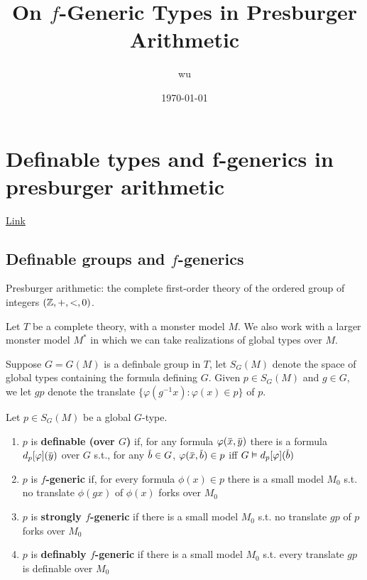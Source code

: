 \documentclass[11pt]{article}
\author{wu}
\date{\today}
\title{On \(f\)-Generic Types in Presburger Arithmetic}
\begin{document}
\maketitle
\tableofcontents

\section{Definable types and f-generics in presburger arithmetic}
\label{sec:orgb16624a}
\href{https://people.math.osu.edu/conant.38/Math/presburger\_note.pdf}{Link}
\subsection{Definable groups and \texorpdfstring{\(f\)}{f}-generics}
\label{sec:org093ff66}
Presburger arithmetic: the complete first-order theory of the ordered group of
integers \((\mathbb{Z},+,<,0)\).

Let \(T\) be a complete theory, with a monster model \(M\). We also work with a larger monster
model \(M^*\) in which we can take realizations of global types over \(M\).

Suppose \(G=G(M)\) is a definbale group in \(T\), let \(S_G(M)\) denote the space of global
types containing the formula defining \(G\). Given \(p\in S_G(M)\) and \(g\in G\), we let \(gp\)
denote the translate \(\{\varphi(g^{-1}x):\varphi(x)\in p\}\) of \(p\).

\begin{definition}[]
Let \(p\in S_G(M)\) be a global \(G\)-type.
\begin{enumerate}
\item \(p\) is \textbf{definable (over \(G\))} if, for any formula \(\varphi(\barx,\bary)\) there is a
formula \(d_p[\varphi](\bary)\) over \(G\) s.t., for any \(\barb\in G\), \(\varphi(\barx,\barb)\in p\)
iff \(G\vDash d_p[\varphi](\barb)\)
\item \(p\) is \textbf{\(f\)-generic} if, for every formula \(\phi(x)\in p\) there is a small
model \(M_0\) s.t. no translate \(\phi(gx)\) of \(\phi(x)\) forks over \(M_0\)
\item \(p\) is \textbf{strongly \(f\)-generic} if there is a small model \(M_0\) s.t. no translate \(gp\)
of \(p\) forks over \(M_0\)
\item \(p\) is \textbf{definably \(f\)-generic} if there is a small model \(M_0\) s.t. every translate
\(gp\) is definable over \(M_0\)
\end{enumerate}
\end{definition}
\end{document}
